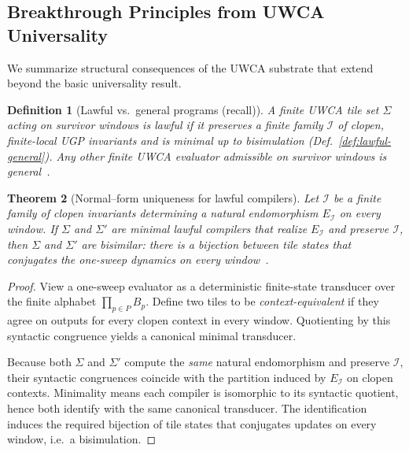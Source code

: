 \documentclass[12pt]{article}
\newtheorem{theorem}{Theorem}[section]
\newtheorem{definition}[theorem]{Definition}
\numberwithin{equation}{section}
\begin{document}
\subsection{Breakthrough Principles from UWCA Universality}\label{subsec:uwca-breakthroughs}

We summarize structural consequences of the UWCA substrate that extend beyond the basic universality result.

\begin{definition}[Lawful vs.\ general programs (recall)]\label{def:lawful-general-recall}
A finite UWCA tile set $\Sigma$ acting on survivor windows is \emph{lawful} if it preserves a finite family $\mathcal{I}$ of clopen, finite-local UGP invariants and is minimal up to bisimulation (Def.~\ref{def:lawful-general}). Any other finite UWCA evaluator admissible on survivor windows is \emph{general}~\cite{SpivackUGPFormalization,ugp-lean}.
\end{definition}

\begin{theorem}[Normal--form uniqueness for lawful compilers]\label{thm:lawful-uniqueness}
Let $\mathcal{I}$ be a finite family of clopen invariants determining a natural endomorphism $E_\mathcal{I}$ on every window. If $\Sigma$ and $\Sigma'$ are \emph{minimal} lawful compilers that realize $E_\mathcal{I}$ and preserve $\mathcal{I}$, then $\Sigma$ and $\Sigma'$ are bisimilar: there is a bijection between tile states that conjugates the one-sweep dynamics on every window~\cite{SpivackUGPFormalization,ugp-lean}.
\end{theorem}

\begin{proof}
View a one-sweep evaluator as a deterministic finite-state transducer over the finite alphabet $\prod_{p\in P}B_p$. Define two tiles to be \emph{context-equivalent} if they agree on outputs for every clopen context in every window. Quotienting by this syntactic congruence yields a canonical minimal transducer.

Because both $\Sigma$ and $\Sigma'$ compute the \emph{same} natural endomorphism and preserve $\mathcal{I}$, their syntactic congruences coincide with the partition induced by $E_\mathcal{I}$ on clopen contexts. Minimality means each compiler is isomorphic to its syntactic quotient, hence both identify with the same canonical transducer. The identification induces the required bijection of tile states that conjugates updates on every window, i.e.\ a bisimulation.
\end{proof}
\end{document}
